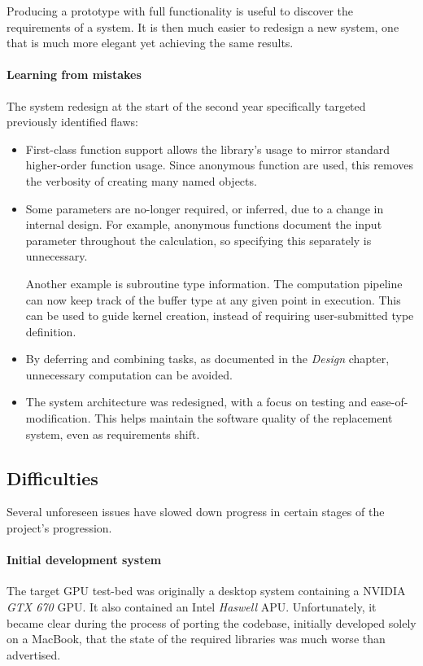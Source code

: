 Producing a prototype with full functionality is useful to discover the requirements of a system. It is then much easier to redesign a new system, one that is much more elegant yet achieving the same results.

\paragraph*{Learning from mistakes}
The system redesign at the start of the second year specifically targeted previously identified flaws:
\begin{itemize}
    \item First-class function support allows the library's usage to mirror standard higher-order function usage. Since anonymous function are used, this removes the verbosity of creating many named objects.

    \item Some parameters are no-longer required, or inferred, due to a change in internal design. For example, anonymous functions document the input parameter throughout the calculation, so specifying this separately is unnecessary.

      Another example is subroutine type information. The computation pipeline can now keep track of the buffer type at any given point in execution. This can be used to guide kernel creation, instead of requiring user-submitted type definition.

    \item By deferring and combining tasks, as documented in the \emph{Design} chapter, unnecessary computation can be avoided.

    \item The system architecture was redesigned, with a focus on testing and ease-of-modification. This helps maintain the software quality of the replacement system, even as requirements shift.
\end{itemize}

\subsection{Difficulties}
Several unforeseen issues have slowed down progress in certain stages of the project's progression.

\paragraph*{Initial development system}
The target \ac{GPU} test-bed was originally a desktop system containing a NVIDIA \emph{GTX 670} \ac{GPU}. It also contained an Intel \emph{Haswell} \ac{APU}. Unfortunately, it became clear during the process of porting the codebase, initially developed solely on a MacBook, that the state of the required libraries was much worse than advertised.

